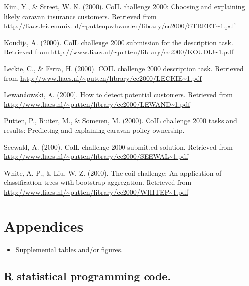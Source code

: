 \documentclass[man]{apa6}
\providecommand{\tightlist}{%
  \setlength{\itemsep}{0pt}\setlength{\parskip}{0pt}}
\begin{document}
\leavevmode\hypertarget{ref-Kim}{}%
Kim, Y., \& Street, W. N. (2000). CoIL challenge 2000: Choosing and explaining likely caravan insurance customers. Retrieved from \url{http://liacs.leidenuniv.nl/~puttenpwhvander/library/cc2000/STREET~1.pdf}

\leavevmode\hypertarget{ref-Koudijs}{}%
Koudijs, A. (2000). CoIL challenge 2000 submission for the description task. Retrieved from \url{http://www.liacs.nl/~putten/library/cc2000/KOUDIJ~1.pdf}

\leavevmode\hypertarget{ref-Leckie}{}%
Leckie, C., \& Ferra, H. (2000). COIL challenge 2000 description task. Retrieved from \url{http://www.liacs.nl/~putten/library/cc2000/LECKIE~1.pdf}

\leavevmode\hypertarget{ref-Lewandowski}{}%
Lewandowski, A. (2000). How to detect potential customers. Retrieved from \url{http://www.liacs.nl/~putten/library/cc2000/LEWAND~1.pdf}

\leavevmode\hypertarget{ref-Putten}{}%
Putten, P., Ruiter, M., \& Someren, M. (2000). CoIL challenge 2000 tasks and results: Predicting and explaining caravan policy ownership.

\leavevmode\hypertarget{ref-Seewald}{}%
Seewald, A. (2000). CoIL challenge 2000 submitted solution. Retrieved from \url{http://www.liacs.nl/~putten/library/cc2000/SEEWAL~1.pdf}

\leavevmode\hypertarget{ref-White}{}%
White, A. P., \& Liu, W. Z. (2000). The coil challenge: An application of classification trees with bootstrap aggregation. Retrieved from \url{http://www.liacs.nl/~putten/library/cc2000/WHITEP~1.pdf}

\endgroup

\newpage

\hypertarget{appendices}{%
\section{Appendices}\label{appendices}}

\begin{itemize}
\tightlist
\item
  Supplemental tables and/or figures.
\end{itemize}

\hypertarget{r-statistical-programming-code.}{%
\subsection{R statistical programming code.}\label{r-statistical-programming-code.}}
\end{document}
